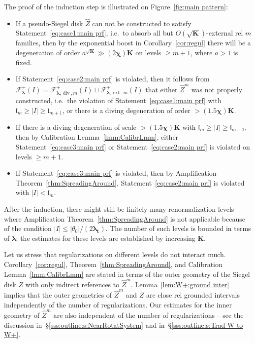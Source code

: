 \documentclass{amsart}
\newcommand{\1}{{\mathbb 1 }}
\newcommand{\blambda}{{\boldsymbol\lambda}}
\newcommand{\ext}{{\operatorname{ext}}}
\renewcommand{\div}{{\operatorname{div}}}
\newcommand{\Fam}{{\mathcal F}}
\newcommand{\wZ}{{\widehat Z}}
\newcommand{\bK}{{\mathbf K}}
\newcommand{\bbt}{{\mathbf t}}
\newcommand{\length}{{\mathfrak l}}
\theoremstyle{remark}
\numberwithin{equation}{section}
\theoremstyle{definition}
\newcommand{\bchi}{{\boldsymbol{ \chi}}}
\begin{document}
The proof of the induction step is illustrated on Figure~\ref{fig:main pattern}: 

\begin{itemize}
\item If a pseudo-Siegel disk $\wZ$ can not be constructed to satisfy Statement~\ref{eq:case1:main prf}, i.e.~to absorb all but $O(\sqrt{\bK})$-external rel $m$ families, then by the exponential boost in Corollary~\ref{cor:regul} there will be a degeneration of order $a^{\sqrt{\bK}} \gg (2\bchi)\bK$ on levels $\ge m+1$, where $a>1$ is fixed.


\item If Statement~\ref{eq:case2:main prf} is violated, then it follows from $\Fam_\blambda^+(I)={\Fam^+_{\blambda,\div,m}(I)\sqcup \Fam^+_{\blambda,\ext,m}(I)}$ that either $\wZ^m$ was not properly constructed, i.e.~the violation of Statement~\ref{eq:case1:main prf} with $\length _{m}\ge |I|\ge\length_{m+1}$, or there is a diving degeneration of order $> (1.5 \bchi)\bK$.

\item If there is a diving degeneration of scale $> (1.5 \bchi)\bK$ with $\length _{m}\ge |I|\ge\length_{m+1}$, then by Calibration Lemma~\ref{lmm:CalibrLmm}, either Statement~\ref{eq:case3:main prf} or Statement~\ref{eq:case2:main prf}  is violated on levels $\ge m+1$.

\item If Statement~\ref{eq:case3:main prf} is violated, then by Amplification Theorem~\ref{thm:SpreadingAround}, Statement~\ref{eq:case2:main prf} is violated with $|I|< \length_m$. 
\end{itemize} 
 
 After the induction, there might still be finitely many renormalization levels where Amplification Theorem~\ref{thm:SpreadingAround} is not applicable because of the condition $|I|\le |\theta_0|/(2\blambda_\bbt)$. The number of such levels is bounded in terms of $\blambda$; the estimates for these levels are established by increasing $\bK$.


Let us stress that regularizations on different levels do not interact much. Corollary~\ref{cor:regul}, Theorem~\ref{thm:SpreadingAround}, and Calibration Lemma~\ref{lmm:CalibrLmm}  are stated in terms of the outer geometry of the Siegel disk $Z$ with only indirect references to $\wZ^m$. Lemma~\ref{lem:W+:ground inter} implies that the outer geometries of $\wZ^m$ and $\overline Z$ are close rel grounded intervals independently of the number of regularizations. Our estimates for the inner geometry of $\wZ^m$ are also independent of the number of regularizations -- see the discussion in~\S\ref{sss:outline:s:NearRotatSystem} and in~\S\ref{sss:outline:s:Trad W to W+}.
\end{document}

